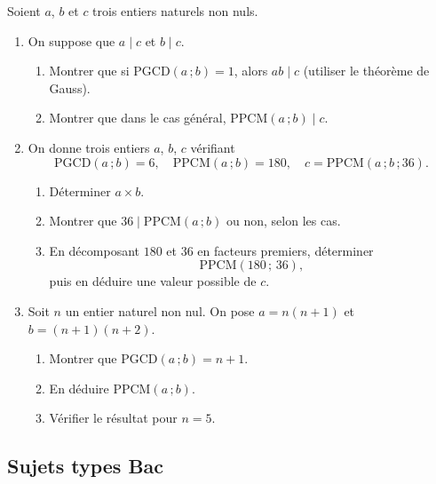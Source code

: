 
Soient $a$, $b$ et $c$ trois entiers naturels non nuls.

\begin{enumerate}
	\item On suppose que $a \mid c$ et $b \mid c$.
	\begin{enumerate}
		\item Montrer que si $\mathrm{PGCD}(a\,;b) = 1$, alors $ab \mid c$
		(utiliser le théorème de Gauss).
		\item Montrer que dans le cas général, $\mathrm{PPCM}(a\,;b) \mid c$.
	\end{enumerate}

	\item On donne trois entiers $a$, $b$, $c$ vérifiant
	$$
	\mathrm{PGCD}(a\,;b) = 6, \quad \mathrm{PPCM}(a\,;b) = 180, \quad c = \mathrm{PPCM}(a\,;b\,;36).
	$$
	\begin{enumerate}
		\item Déterminer $a \times b$.
		\item Montrer que $36 \mid \mathrm{PPCM}(a\,;b)$ ou non, selon les cas.
		\item En décomposant $180$ et $36$ en facteurs premiers, déterminer
		$$
		\mathrm{PPCM}(180\,;\,36),
		$$
		puis en déduire une valeur possible de $c$.
	\end{enumerate}

	\item Soit $n$ un entier naturel non nul. On pose $a = n(n+1)$ et $b = (n+1)(n+2)$.
	\begin{enumerate}
		\item Montrer que $\mathrm{PGCD}(a\,;b) = n+1$.
		\item En déduire $\mathrm{PPCM}(a\,;b)$.
		\item Vérifier le résultat pour $n = 5$.
	\end{enumerate}
\end{enumerate}





\subsection{Sujets types Bac}

